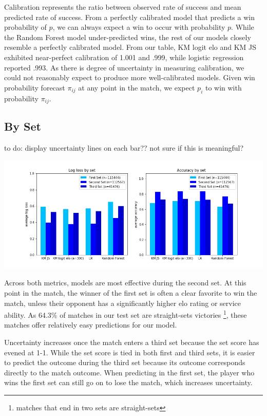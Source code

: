 \documentclass[chapterprefix=false]{report}
\begin{document}
Calibration represents the ratio between observed rate of success and mean predicted rate of success. From a perfectly calibrated model that predicts a win probability of $p$, we can always expect a win to occur with probability $p$. While the Random Forest model under-predicted wins, the rest of our models closely resemble a perfectly calibrated model. From our table, KM logit elo and KM JS exhibited near-perfect calibration of 1.001 and .999, while logistic regression reported .993. As there is degree of uncertainty in measuring calibration, we could not reasonably expect to produce more well-calibrated models. Given win probability forecast $\pi_{ij}$ at any point in the match, we expect $p_i$ to win with probability $\pi_{ij}$.

\subsection{By Set}

to do: display uncertainty lines on each bar?? not sure if this is meaningful?

\hspace*{-1.5cm}\includegraphics[scale=.6]{set_performance}

Across both metrics, models are most effective during the second set. At this point in the match, the winner of the first set is often a clear favorite to win the match, unless their opponent has a significantly higher elo rating or service ability. As 64.3\% of matches in our test set are straight-sets victories \footnote{matches that end in two sets are straight-sets}, these matches offer relatively easy predictions for our model.

Uncertainty increases once the match enters a third set because the set score has evened at 1-1. While the set score is tied in both first and third sets, it is easier to predict the outcome during the third set because its outcome corresponds directly to the match outcome. When predicting in the first set, the player who wins the first set can still go on to lose the match, which increases uncertainty.
\end{document}
